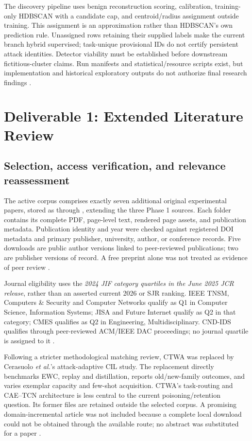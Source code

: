 \documentclass[10pt,a4paper]{article}
\begin{document}
The discovery pipeline uses benign reconstruction scoring, calibration, training-only HDBSCAN with a candidate cap, and centroid/radius assignment outside training. This assignment is an approximation rather than HDBSCAN's own prediction rule. Unassigned rows retaining their supplied labels make the current branch hybrid supervised; task-unique provisional IDs do not certify persistent attack identities. Detector viability must be established before downstream fictitious-cluster claims. Run manifests and statistical/resource scripts exist, but implementation and historical exploratory outputs do not authorize final research findings \cite{repo}.

\section{Deliverable 1: Extended Literature Review}
\subsection{Selection, access verification, and relevance reassessment}
The active corpus comprises exactly seven additional original experimental papers, stored as  through , extending the three Phase 1 sources. Each folder contains its complete PDF, page-level text, rendered page assets, and publication metadata. Publication identity and year were checked against registered DOI metadata and primary publisher, university, author, or conference records. Five downloads are public author versions linked to peer-reviewed publications; two are publisher versions of record. A free preprint alone was not treated as evidence of peer review \cite{carillo,lavaur,cnd,wei,cerasuolo,guo,ensemble,repo}.

Journal eligibility uses the \emph{2024 JIF category quartiles in the June 2025 JCR release}, rather than an asserted current 2026 or SJR ranking. IEEE TNSM, Computers \& Security and Computer Networks qualify as Q1 in Computer Science, Information Systems; JISA and Future Internet qualify as Q2 in that category; CMES qualifies as Q2 in Engineering, Multidisciplinary. CND-IDS qualifies through peer-reviewed ACM/IEEE DAC proceedings; no journal quartile is assigned to it \cite{jcr,dac}.

Following a stricter methodological matching review, CTWA was replaced by Cerasuolo \emph{et al.}'s attack-adaptive CIL study. The replacement directly benchmarks EWC, replay and distillation, reports old/new-family outcomes, and varies exemplar capacity and few-shot acquisition. CTWA's task-routing and CAE--TCN architecture is less central to the current poisoning/retention question. Its former files are retained outside the selected corpus. A promising domain-incremental article was not included because a complete local download could not be obtained through the available route; no abstract was substituted for a paper \cite{cerasuolo,repo}.
\end{document}
